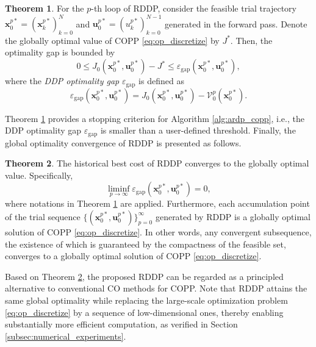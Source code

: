 \documentclass[journal]{IEEEtran}
\theoremstyle{definition}
\newtheorem{theorem}{Theorem}
\theoremstyle{definition}
\renewcommand\vector[1]{\boldsymbol{#1}}
\newcommand\vx{{\vector{x}}}
\newcommand\bx{{\mathbf{x}}}
\newcommand\bu{{\mathbf{u}}}
\begin{document}
\begin{theorem}\label{thm:near_optimality_gap}
    For the $p$-th loop of RDDP, consider the feasible trial trajectory $\bx_0^{p*}=(\vx_k^{p*})_{k=0}^N$ and $\bu_0^{p*}=(u_k^{p*})_{k=0}^{N-1}$ generated in the forward pass. Denote the globally optimal value of COPP \eqref{eq:op_discretize} by $J^*$. Then, the optimality gap is bounded by
    \begin{equation}
        0\leq J_0(\bx_0^{p*},\bu_0^{p*}) - J^* \leq \varepsilon_\text{gap}(\bx_0^{p*},\bu_0^{p*}),
    \end{equation}
    where the \textit{DDP optimality gap} $\varepsilon_\text{gap}$ is defined as
    \begin{equation}\label{eq:dual_gap}
        \varepsilon_\text{gap}(\bx_0^{p*},\bu_0^{p*})=J_0(\bx_0^{p*},\bu_0^{p*}) - \mathcal{V}_0^p(\vx_0^{p*}).
    \end{equation}
\end{theorem}

Theorem \ref{thm:near_optimality_gap} provides a stopping criterion for Algorithm \ref{alg:ardp_copp}, i.e., the DDP optimality gap $\varepsilon_\text{gap}$ is smaller than a user-defined threshold. Finally, the global optimality convergence of RDDP is presented as follows.

\begin{theorem}\label{thm:adrp_optimal}
    The historical best cost of RDDP converges to the globally optimal value. Specifically,
    \begin{equation}\label{eq:convergence_condition}
        \liminf_{p \to \infty} \varepsilon_\text{gap}(\bx_0^{p*},\bu_0^{p*}) = 0,
    \end{equation}
    where notations in Theorem \ref{thm:near_optimality_gap} are applied. Furthermore, each accumulation point of the trial sequence $\{(\bx_0^{p*},\bu_0^{p*})\}_{p=0}^\infty$ generated by RDDP is a globally optimal solution of COPP \eqref{eq:op_discretize}. In other words, any convergent subsequence, the existence of which is guaranteed by the compactness of the feasible set, converges to a globally optimal solution of COPP \eqref{eq:op_discretize}.
\end{theorem}

Based on Theorem \ref{thm:adrp_optimal}, the proposed RDDP can be regarded as a principled alternative to conventional CO methods for COPP. Note that RDDP attains the same global optimality while replacing the large-scale optimization problem \eqref{eq:op_discretize} by a sequence of low-dimensional ones, thereby enabling substantially more efficient computation, as verified in Section \ref{subsec:numerical_experiments}.
\end{document}
